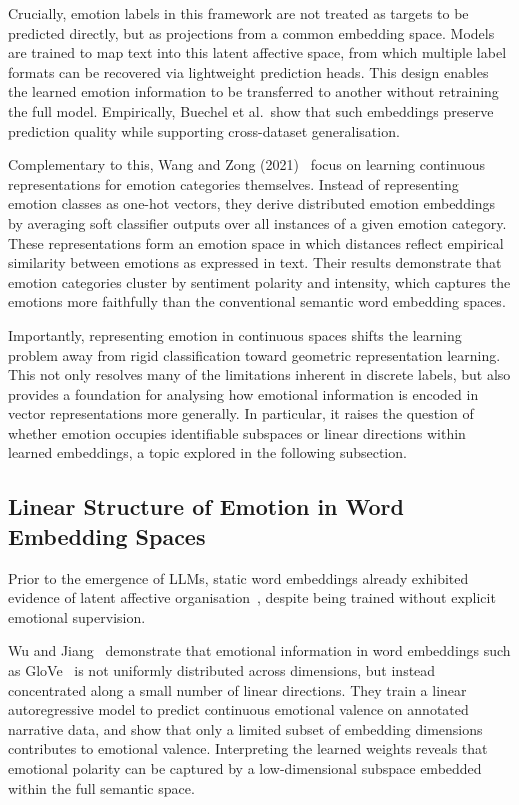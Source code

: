 Crucially, emotion labels in this framework are not treated as targets to be predicted directly, but as projections from a common embedding space. Models are trained to map text into this latent affective space, from which multiple label formats can be recovered via lightweight prediction heads. This design enables the learned emotion information to be transferred to another without retraining the full model. Empirically, Buechel et al.\ show that such embeddings preserve prediction quality while supporting cross-dataset generalisation.

Complementary to this, Wang and Zong (2021)~\cite{wang-zong-2021-distributed} focus on learning continuous representations for emotion categories themselves. Instead of representing emotion classes as one-hot vectors, they derive distributed emotion embeddings by averaging soft classifier outputs over all instances of a given emotion category. These representations form an emotion space in which distances reflect empirical similarity between emotions as expressed in text. Their results demonstrate that emotion categories cluster by sentiment polarity and intensity, which captures the emotions more faithfully than the conventional semantic word embedding spaces.

Importantly, representing emotion in continuous spaces shifts the learning problem away from rigid classification toward geometric representation learning. This not only resolves many of the limitations inherent in discrete labels, but also provides a foundation for analysing how emotional information is encoded in vector representations more generally. In particular, it raises the question of whether emotion occupies identifiable subspaces or linear directions within learned embeddings, a topic explored in the following subsection.

\subsection{Linear Structure of Emotion in Word Embedding Spaces} \label{linear_word_embedding}

Prior to the emergence of LLMs, static word embeddings already exhibited evidence of latent affective organisation~\cite{radford2017learninggeneratereviewsdiscovering}, despite being trained without explicit emotional supervision.

Wu and Jiang~\cite{linear_vector_emo} demonstrate that emotional information in word embeddings such as GloVe~\cite{pennington2014glove} is not uniformly distributed across dimensions, but instead concentrated along a small number of linear directions. They train a linear autoregressive model to predict continuous emotional valence on annotated narrative data, and show that only a limited subset of embedding dimensions contributes to emotional valence. Interpreting the learned weights reveals that emotional polarity can be captured by a low-dimensional subspace embedded within the full semantic space.

